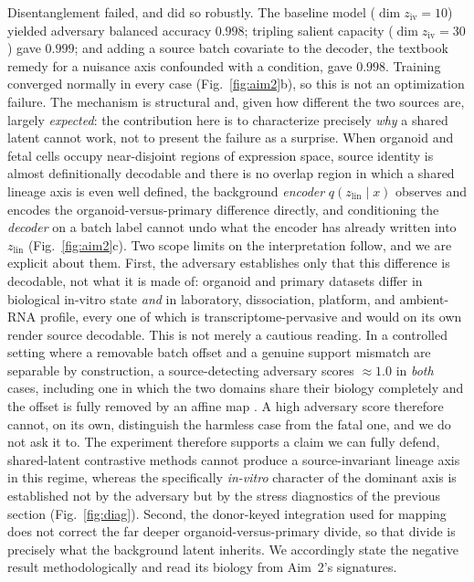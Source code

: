 \documentclass[11pt]{article}
\newcommand{\zlin}{\ensuremath{z_{\mathrm{lin}}}}
\newcommand{\ziv}{\ensuremath{z_{\mathrm{iv}}}}
\begin{document}
Disentanglement failed, and did so robustly. The baseline model
($\dim\ziv=10$) yielded adversary balanced accuracy $0.998$; tripling salient capacity ($\dim\ziv=30$)
gave $0.999$; and adding a source batch covariate to the decoder, the textbook remedy for a nuisance
axis confounded with a condition, gave $0.998$. Training converged normally in every case
(Fig.~\ref{fig:aim2}b), so this is not an optimization failure. The mechanism is structural and, given
how different the two sources are, largely \emph{expected}: the contribution here is to characterize
precisely \emph{why} a shared latent cannot work, not to present the failure as a surprise. When
organoid and fetal cells occupy near-disjoint regions of expression space, source identity is almost
definitionally decodable and there is no overlap region in which a shared lineage axis is even well
defined, the background \emph{encoder} $q(\zlin\!\mid\!x)$ observes and encodes the
organoid-versus-primary difference directly, and conditioning the \emph{decoder} on a batch label cannot
undo what the encoder has already written into \zlin{} (Fig.~\ref{fig:aim2}c). Two scope limits on the
interpretation follow, and we are explicit about them. First, the adversary establishes only that this
difference is decodable, not what it is made of: organoid and primary datasets differ in biological
in-vitro state \emph{and} in laboratory, dissociation, platform, and ambient-RNA profile, every one of
which is transcriptome-pervasive and would on its own render source decodable. This is not merely a
cautious reading. In a controlled setting where a removable batch offset and a genuine support mismatch
are separable by construction, a source-detecting adversary scores $\approx\!1.0$ in \emph{both} cases,
including one in which the two domains share their biology completely and the offset is fully removed by
an affine map \citep{nullstate2026identifiability}. A high adversary score therefore cannot, on its own,
distinguish the harmless case from the fatal one, and we do not ask it to. The experiment therefore
supports a claim we can fully defend, shared-latent contrastive methods cannot produce a
source-invariant lineage axis in this regime, whereas the specifically \emph{in-vitro} character of the
dominant axis is established not by the adversary but by the stress diagnostics of the previous section
(Fig.~\ref{fig:diag}). Second, the donor-keyed integration used for mapping does not correct the far
deeper organoid-versus-primary divide, so that divide is precisely what the background latent inherits.
We accordingly state the negative result methodologically and read its biology from Aim~2's signatures.
\end{document}
